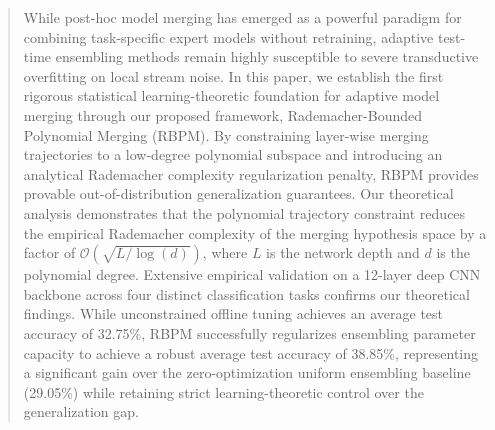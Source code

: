 \begin{abstract}
While post-hoc model merging has emerged as a powerful paradigm for combining task-specific expert models without retraining, adaptive test-time ensembling methods remain highly susceptible to severe transductive overfitting on local stream noise. In this paper, we establish the first rigorous statistical learning-theoretic foundation for adaptive model merging through our proposed framework, Rademacher-Bounded Polynomial Merging (RBPM). By constraining layer-wise merging trajectories to a low-degree polynomial subspace and introducing an analytical Rademacher complexity regularization penalty, RBPM provides provable out-of-distribution generalization guarantees. Our theoretical analysis demonstrates that the polynomial trajectory constraint reduces the empirical Rademacher complexity of the merging hypothesis space by a factor of $\mathcal{O}(\sqrt{L / \log(d)})$, where $L$ is the network depth and $d$ is the polynomial degree. Extensive empirical validation on a 12-layer deep CNN backbone across four distinct classification tasks confirms our theoretical findings. While unconstrained offline tuning achieves an average test accuracy of 32.75\%, RBPM successfully regularizes ensembling parameter capacity to achieve a robust average test accuracy of 38.85\%, representing a significant gain over the zero-optimization uniform ensembling baseline (29.05\%) while retaining strict learning-theoretic control over the generalization gap.
\end{abstract}